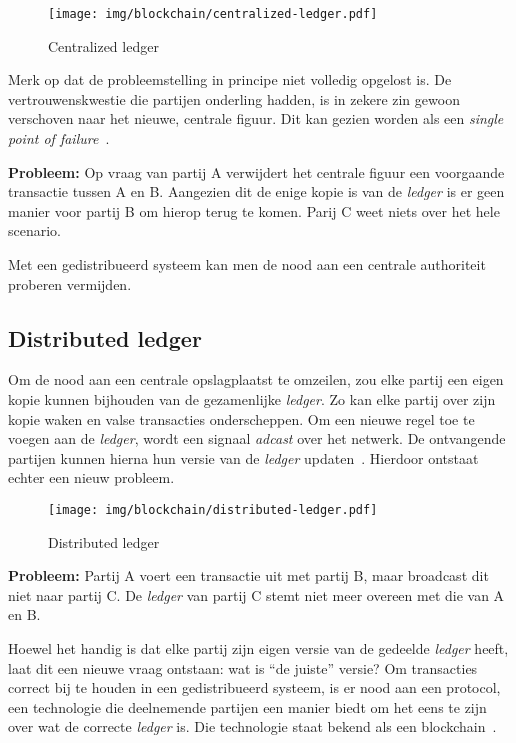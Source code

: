 \begin{figure}[H]
	\centering
	\texttt{[image: img/blockchain/centralized-ledger.pdf]}
	\caption{\label{fig:centralized-ledger}Centralized ledger}
\end{figure}

Merk op dat de probleemstelling in principe niet volledig opgelost is. De vertrouwenskwestie die partijen onderling hadden, is in zekere zin gewoon verschoven naar het nieuwe, centrale figuur. Dit kan gezien worden als een \textit{single point of failure}~\autocite{Majaski2021}.

\textbf{Probleem:} 
Op vraag van partij A verwijdert het centrale figuur een voorgaande transactie tussen A en B. 
Aangezien dit de enige kopie is van de \textit{ledger} is er geen manier voor partij B om hierop terug te komen. Parij C weet niets over het hele scenario.

Met een gedistribueerd systeem kan men de nood aan een centrale authoriteit proberen vermijden.


\subsection{Distributed ledger}
\label{sub:distributed-ledger}

Om de nood aan een centrale opslagplaatst te omzeilen, zou elke partij een eigen kopie kunnen bijhouden van de gezamenlijke \textit{ledger}. Zo kan elke partij over zijn kopie waken en valse transacties onderscheppen. Om een nieuwe regel toe te voegen aan de \textit{ledger}, wordt een signaal \textit{adcast} over het netwerk. De ontvangende partijen kunnen hierna hun versie van de \textit{ledger} updaten~\autocite{Nakamoto2008}. Hierdoor ontstaat echter een nieuw probleem.

\begin{figure}[H]
	\centering
	\texttt{[image: img/blockchain/distributed-ledger.pdf]}
	\caption{\label{fig:distributed-ledger}Distributed ledger}
\end{figure}

\textbf{Probleem:} Partij A voert een transactie uit met partij B, maar broadcast dit niet naar partij C. De \textit{ledger} van partij C stemt niet meer overeen met die van A en B.

Hoewel het handig is dat elke partij zijn eigen versie van de gedeelde \textit{ledger} heeft, laat dit een nieuwe vraag ontstaan: wat is ``de juiste'' versie? Om transacties correct bij te houden in een gedistribueerd systeem, is er nood aan een protocol, een technologie die deelnemende partijen een manier biedt om het eens te zijn over wat de correcte \textit{ledger} is. Die technologie staat bekend als een blockchain~\autocite{Chaudhry2018}.


